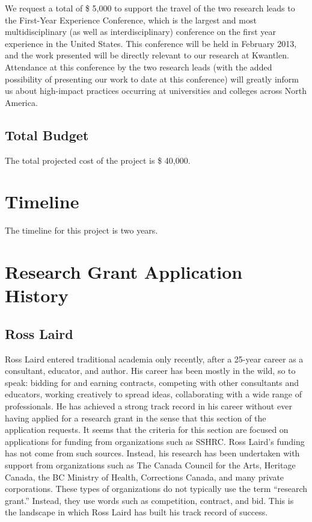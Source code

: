\documentclass[letterpaper,10pt,headsepline]{scrreprt}
\begin{document}
We request a total of \$ 5,000 to support the travel of the two research leads
to the First-Year Experience Conference, which is the largest and most
multidisciplinary (as well as interdisciplinary) conference on the first year
experience in the United States. This conference will be held in February
2013, and the work presented will be directly relevant to our research at
Kwantlen. Attendance at this conference by the two research leads (with the
added possibility of presenting our work to date at this conference) will
greatly inform us about high-impact practices occurring at universities and
colleges across North America.

\subsection{Total Budget}

The total projected cost of the project is \$ 40,000.

\section{Timeline}

The timeline for this project is two years.


\section{Research Grant Application History}

\subsection{Ross Laird}


Ross Laird entered traditional academia only recently, after a 25-year career
as a consultant, educator, and author. His career has been mostly in the wild,
so to speak: bidding for and earning contracts, competing with other
consultants and educators, working creatively to spread ideas, collaborating
with a wide range of professionals. He has achieved a strong track record in
his career without ever having applied for a research grant in the sense that
this section of the application requests. It seems that the criteria for this
section are focused on applications for funding from organizations such as
SSHRC. Ross Laird's funding has not come from such sources. Instead, his
research has been undertaken with support from organizations such as The
Canada Council for the Arts, Heritage Canada, the BC Ministry of Health,
Corrections Canada, and many private corporations. These types of
organizations do not typically use the term ``research grant.'' Instead, they
use words such as competition, contract, and bid. This is the landscape in
which Ross Laird has built his track record of success.
\end{document}
